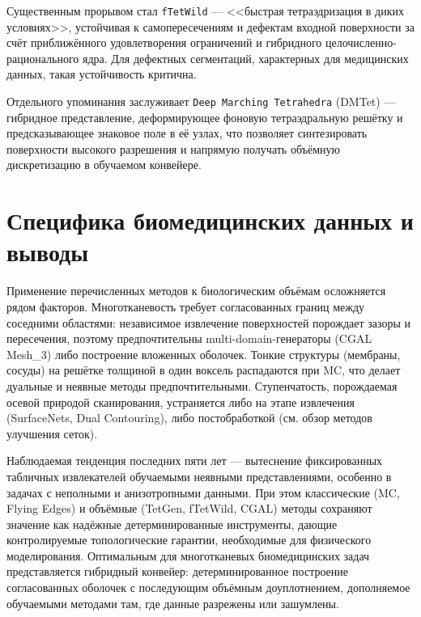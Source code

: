 \documentclass[a4paper,14pt]{article}
\begin{document}
Существенным прорывом стал \texttt{fTetWild} \cite{ftetwild2020} --- <<быстрая тетраэдризация в диких условиях>>, устойчивая к самопересечениям и дефектам входной поверхности за счёт приближённого удовлетворения ограничений и гибридного целочисленно-рационального ядра. Для дефектных сегментаций, характерных для медицинских данных, такая устойчивость критична.

Отдельного упоминания заслуживает \texttt{Deep Marching Tetrahedra} (DMTet) \cite{shen2021dmtet} --- гибридное представление, деформирующее фоновую тетраэдральную решётку и предсказывающее знаковое поле в её узлах, что позволяет синтезировать поверхности высокого разрешения и напрямую получать объёмную дискретизацию в обучаемом конвейере.

\section{Специфика биомедицинских данных и выводы}

Применение перечисленных методов к биологическим объёмам осложняется рядом факторов. Многотканевость требует согласованных границ между соседними областями: независимое извлечение поверхностей порождает зазоры и пересечения, поэтому предпочтительны multi-domain-генераторы (CGAL Mesh\_3) либо построение вложенных оболочек. Тонкие структуры (мембраны, сосуды) на решётке толщиной в один воксель распадаются при MC, что делает дуальные и неявные методы предпочтительными. Ступенчатость, порождаемая осевой природой сканирования, устраняется либо на этапе извлечения (SurfaceNets, Dual Contouring), либо постобработкой (см. обзор методов улучшения сеток).

Наблюдаемая тенденция последних пяти лет --- вытеснение фиксированных табличных извлекателей обучаемыми неявными представлениями, особенно в задачах с неполными и анизотропными данными. При этом классические (MC, Flying Edges) и объёмные (TetGen, fTetWild, CGAL) методы сохраняют значение как надёжные детерминированные инструменты, дающие контролируемые топологические гарантии, необходимые для физического моделирования. Оптимальным для многотканевых биомедицинских задач представляется гибридный конвейер: детерминированное построение согласованных оболочек с последующим объёмным доуплотнением, дополняемое обучаемыми методами там, где данные разрежены или зашумлены.
\end{document}
